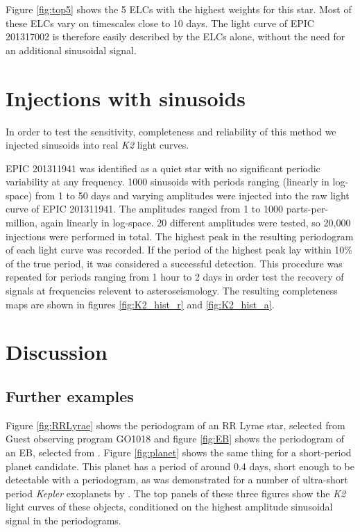 \documentclass[useAMS, usenatbib]{aastex}
\begin{document}
Figure \ref{fig:top5} shows the 5 ELCs with the highest weights
for this star.
Most of these ELCs vary on timescales close to 10 days.
The light curve of EPIC 201317002 is therefore easily described by the ELCs
alone, without the need for an additional sinusoidal signal.

\section{Injections with sinusoids}

In order to test the sensitivity, completeness and reliability of this method
we injected sinusoids into real {\it K2} light curves.

EPIC 201311941 was identified as a quiet star with no significant periodic
variability at any frequency.
1000 sinusoids with periods ranging (linearly in log-space) from 1 to 50 days
and varying amplitudes were injected into the raw light curve of EPIC
201311941.
The amplitudes ranged from 1 to 1000 parts-per-million, again linearly in
log-space.
20 different amplitudes were tested, so 20,000 injections were performed in
total.
The highest peak in the resulting periodogram of each light curve was recorded.
If the period of the highest peak lay within 10\% of the true period, it was
considered a successful detection.
This procedure was repeated for periods ranging from 1 hour to 2 days in order
test the recovery of signals at frequencies relevent to asteroseismology.
The resulting completeness maps are shown in figures \ref{fig:K2_hist_r} and
\ref{fig:K2_hist_a}.

\section{Discussion}

\subsection{Further examples}
Figure \ref{fig:RRLyrae} shows the periodogram of an RR Lyrae star, selected
from Guest observing program GO1018 and figure
\ref{fig:EB} shows the periodogram of an EB, selected from
\citet{Armstrong2015}.
Figure \ref{fig:planet} shows the same thing for a short-period planet
candidate.
This planet has a period of around 0.4 days, short enough to be detectable
with a periodogram, as was demonstrated for a number of ultra-short
period {\it Kepler} exoplanets by \citet{Sanchis-Ojeda2014}.
The top panels of these three figures show the {\it K2} light curves of these
objects, conditioned on the highest amplitude sinusoidal signal in the
periodograms.
\end{document}
